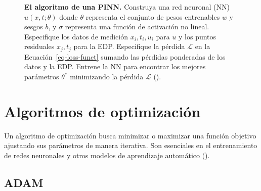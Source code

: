 \documentclass[
  spanish,
  us-letterpaper,
]{scrreprt}
\theoremstyle{plain}
\theoremstyle{definition}
\theoremstyle{remark}
\begin{document}
\begin{figure}


\caption{\label{fig-pinn_graph}\textbf{El algoritmo de una PINN.}
Construya una red neuronal (NN) \(u(x, t; \theta)\) donde \(\theta\)
representa el conjunto de pesos entrenables \(w\) y sesgos \(b\), y
\(\sigma\) representa una función de activación no lineal. Especifique
los datos de medición \({x_i, t_i, u_i}\) para \(u\) y los puntos
residuales \({x_j, t_j}\) para la EDP. Especifique la pérdida
\(\mathcal{L}\) en la Ecuación~\ref{eq-loss-funct} sumando las pérdidas
ponderadas de los datos y la EDP. Entrene la NN para encontrar los
mejores parámetros \(\mathbb{\theta^*}\) minimizando la pérdida
\(\mathcal{L}\) ().}

\end{figure}%

\section{Algoritmos de optimización}\label{sec-optimizadores}

Un algoritmo de optimización busca minimizar o maximizar una función
objetivo ajustando sus parámetros de manera iterativa. Son esenciales en
el entrenamiento de redes neuronales y otros modelos de aprendizaje
automático ().

\subsection{ADAM}\label{adam}
\end{document}
